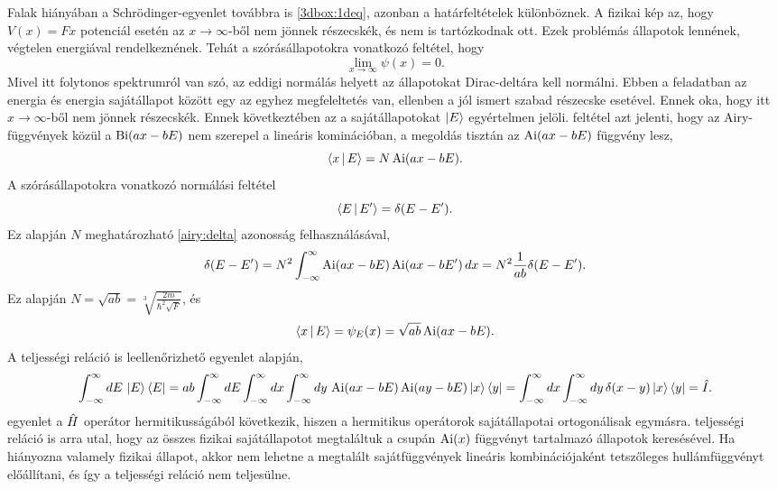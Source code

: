 \label{nowall}
Falak hiányában a Schrödinger-egyenlet továbbra is \eqref{3dbox:1deq}, azonban a határfeltételek különböznek. A fizikai kép az, hogy $V(x)=Fx$ potenciál esetén az $x\to\infty$-ből nem jönnek részecskék, és nem is tartózkodnak ott. Ezek problémás állapotok lennének, végtelen energiával rendelkeznének. Tehát a szórásállapotokra vonatkozó feltétel, hogy
\begin{equation}
	\lim_{x\to\infty}\psi(x) = 0.
	\label{nowall:boundary}
\end{equation}
Mivel itt folytonos spektrumról van szó, az eddigi normálás helyett az állapotokat Dirac-deltára kell normálni. Ebben a feladatban az energia és energia sajátállapot között egy az egyhez megfeleltetés van, ellenben a jól ismert szabad részecske esetével. Ennek oka, hogy itt $x\to\infty$-ből nem jönnek részecskék. Ennek következtében az a sajátállapotokat $\Ket{E}$ egyértelmen jelöli.
 feltétel azt jelenti, hogy az Airy-függvények közül a $\operatorname{Bi}(ax-bE)$ nem szerepel a lineáris kominációban, a megoldás tisztán az $\operatorname{Ai}(ax-bE)$ függvény lesz,
\begin{equation}
	\Braket{x|E}=N\operatorname{Ai}(ax-bE).
\end{equation}
A szórásállapotokra vonatkozó normálási feltétel
\begin{equation}
	\Braket{E|E^\prime}=\delta(E-E^\prime).
\end{equation}
Ez alapján $N$ meghatározható \eqref{airy:delta} azonosság felhasználásával,
\begin{dmath}
	\delta(E-E^\prime)=N^2\int_{-\infty}^\infty\Ai(ax-bE)\Ai(ax-bE^\prime)\,dx=N^2\frac{1}{ab}\delta(E-E^\prime).
	\label{nowall:orthog}
\end{dmath}
Ez alapján $N=\sqrt{ab}=\sqrt[3]{\frac{2m}{\hbar^2\sqrt{F}}}$, és
\begin{equation}
	\Braket{x|E}=\psi_E(x)=\sqrt{ab}\operatorname{Ai}(ax-bE).
	\label{nowell:sajátfüggvény}
\end{equation}
A teljességi reláció is leellenőrizhető  egyenlet alapján,
\begin{dmath}
	\int_{-\infty}^\infty dE\,\Ket{E}\Bra{E}=ab\int_{-\infty}^\infty dE\int_{-\infty}^\infty dx\int_{-\infty}^\infty dy\,\Ai(ax-bE)\Ai(ay-bE)\Ket{x}\Bra{y}=\int_{-\infty}^\infty dx\int_{-\infty}^\infty dy\,\delta(x-y)\Ket{x}\Bra{y}=\op{I}.
	\label{nowall:comleteness}
\end{dmath}
 egyenlet a $\hat{H}$ operátor hermitikusságából következik, hiszen a hermitikus operátorok sajátállapotai ortogonálisak egymásra.  teljességi reláció is arra utal, hogy az összes fizikai sajátállapotot megtaláltuk a csupán $\operatorname{Ai}(x)$ függvényt tartalmazó állapotok keresésével. Ha hiányozna valamely fizikai állapot, akkor nem lehetne a megtalált sajátfüggvények lineáris kombinációjaként tetszőleges hullámfüggvényt előállítani, és így a teljességi reláció nem teljesülne.

